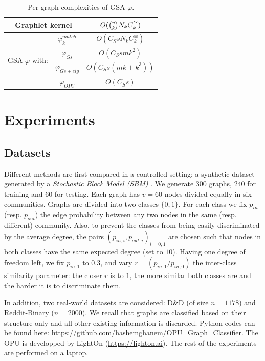 \documentclass{article}
\begin{document}
\begin{table}
\centering
\begin{tabular}{|c|c|c|}
\hline
\multicolumn{2}{|c|}{Graphlet kernel} & $O(\tbinom{v}{k} N_k C^{\cong}_k)$\\ \hline \hline
%
\multirow{4}{*}{GSA-$\varphi$ with:} & $\varphi^{match}_k$ & $O(C_S s N_k C^{\cong}_k)$ \\
& $\varphi_{Gs}$ & $O(C_S s m k^2)$ \\ 
& $\varphi_{Gs+eig}$  & $O(C_S s (m k + k^3))$ \\ 
& $\varphi_{OPU}$  & $O(C_S s)$ \\ \hline
\end{tabular}
\caption{Per-graph complexities of GSA-$\varphi$.}
\label{tab:cost}
\end{table}


\section{Experiments}\label{sec:experiments}
\subsection{Datasets}\label{sec:setup}
%
Different methods are first compared in a controlled setting: a synthetic dataset generated by a \emph{Stochastic Block Model (SBM)} \cite{SBM}. We generate $300$ graphs, $240$ for training  and $60$ for testing. Each graph has $v=60$ nodes divided equally in six communities. Graphs are divided into two classes $\{0 , 1\}$. For each class we fix $p_{in}$ (resp. $p_{out}$) the edge probability between any two nodes in the same (resp. different) community. Also, to prevent the classes from being easily discriminated by the average degree, the pairs $(p_{in,i} , p_{out,i})_{i=0,1}$ are chosen such that nodes in both classes have the same expected degree (set to $10$). Having one degree of freedom left, we fix $p_{in,1}$ to $0.3$, and vary $r=(p_{in,1}/p_{in,0})$ the inter-class similarity parameter: the closer $r$ is to $1$, the more similar both classes are and the harder it is to discriminate them.

In addition, two real-world datasets are considered: D\&D \cite{DD_ref} (of size $n=1178$) and Reddit-Binary \cite{class_Reddit} ($n=2000$). We recall that graphs are classified based on their structure only and all other existing information is discarded. 
Python codes can be found here:  \url{https://github.com/hashemghanem/OPU_Graph_Classifier}. The OPU is developped by LightOn (\url{https://lighton.ai}). The rest of the experiments are performed on a laptop.
\end{document}

